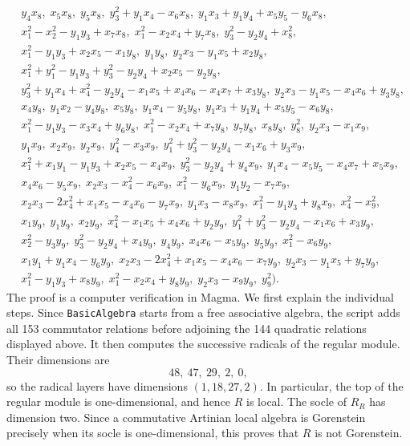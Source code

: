\documentclass[a4paper]{amsart}
\theoremstyle{definition}
\theoremstyle{remark}
\numberwithin{equation}{section}
\begin{document}
{\begin{align*}
& y_4x_8,\; x_5x_8,\; y_5x_8,\; y_3^2+y_1x_4-x_6x_8,\; y_1x_3+y_1y_4+x_5y_5-y_6x_8,\\[-0.2ex]
& x_1^2-x_2^2-y_1y_3+x_7x_8,\; x_1^2-x_2x_4+y_7x_8,\; y_3^2-y_2y_4+x_8^2,\\[-0.2ex]
& x_1^2-y_1y_3+x_2x_5-x_1y_8,\; y_1y_8,\; y_2x_3-y_1x_5+x_2y_8,\\[-0.2ex]
& x_1^2+y_1^2-y_1y_3+y_3^2-y_2y_4+x_2x_5-y_2y_8,\\[-0.2ex]
& y_3^2+y_1x_4+x_4^2-y_2y_4-x_1x_5+x_4x_6-x_4x_7+x_3y_8,\; y_2x_3-y_1x_5-x_4x_6+y_3y_8,\\[-0.2ex]
& x_4y_8,\; y_1x_2-y_4y_8,\; x_5y_8,\; y_1x_4-y_5y_8,\; y_1x_3+y_1y_4+x_5y_5-x_6y_8,\\[-0.2ex]
& x_1^2-y_1y_3-x_3x_4+y_6y_8,\; x_1^2-x_2x_4+x_7y_8,\; y_7y_8,\; x_8y_8,\; y_8^2,\; y_2x_3-x_1x_9,\\[-0.2ex]
& y_1x_9,\; x_2x_9,\; y_2x_9,\; y_4^2-x_3x_9,\; y_1^2+y_3^2-y_2y_4-x_1x_6+y_3x_9,\\[-0.2ex]
& x_1^2+x_1y_1-y_1y_3+x_2x_5-x_4x_9,\; y_3^2-y_2y_4+y_4x_9,\; y_1x_4-x_5y_5-x_4x_7+x_5x_9,\\[-0.2ex]
& x_4x_6-y_5x_9,\; x_2x_3-x_4^2-x_6x_9,\; x_1^2-y_6x_9,\; y_1y_2-x_7x_9,\\[-0.2ex]
& x_2x_3-2x_4^2+x_1x_5-x_4x_6-y_7x_9,\; y_1x_3-x_8x_9,\; x_1^2-y_1y_3+y_8x_9,\; x_4^2-x_9^2,\\[-0.2ex]
& x_1y_9,\; y_1y_9,\; x_2y_9,\; x_4^2-x_1x_5+x_4x_6+y_2y_9,\; y_1^2+y_3^2-y_2y_4-x_1x_6+x_3y_9,\\[-0.2ex]
& x_2^2-y_3y_9,\; y_3^2-y_2y_4+x_4y_9,\; y_4y_9,\; x_4x_6-x_5y_9,\; y_5y_9,\; x_1^2-x_6y_9,\\[-0.2ex]
& x_1y_1+y_1x_4-y_6y_9,\; x_2x_3-2x_4^2+x_1x_5-x_4x_6-x_7y_9,\; y_2x_3-y_1x_5+y_7y_9,\\[-0.2ex]
& x_1^2-y_1y_3+x_8y_9,\; x_1^2-x_2x_4+y_8y_9,\; y_2x_3-x_9y_9,\; y_9^2\bigr).
\end{align*}
}
The proof is a computer verification in Magma.  We first explain the individual steps.  Since \texttt{BasicAlgebra} starts from a free associative algebra, the script adds all 153 commutator relations before adjoining the 144 quadratic relations displayed above.  It then computes the successive radicals of the regular module.  Their dimensions are
\[
 48,\ 47,\ 29,\ 2,\ 0,
\]
so the radical layers have dimensions $(1,18,27,2)$.  In particular, the top of the regular module is one-dimensional, and hence $R$ is local.  The socle of $R_R$ has dimension two.  Since a commutative Artinian local algebra is Gorenstein precisely when its socle is one-dimensional, this proves that $R$ is not Gorenstein.
\end{document}
